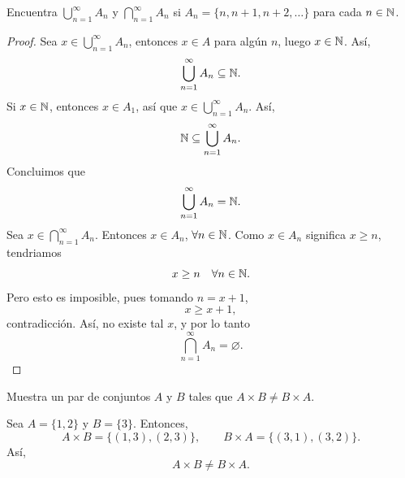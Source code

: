 \documentclass[12pt,a4paper]{book}
\begin{document}
    \begin{ejercicio}
        Encuentra $\bigcup_{n=1}^{\infty}A_{n}$ y $\bigcap_{n=1}^{\infty}A_{n}$ si $A_{n}=\{n,n+1,n+2,\dots\}$
        para cada $n\in\mathbb{N}$.
    \end{ejercicio}

    \begin{proof}
        Sea $x\in\bigcup_{n=1}^{\infty}A_{n}$, entonces $x\in A$ para algún $n$, luego $x\in\mathbb{N}$. Así,
        \begin{equation*}
            \bigcup_{n=1}^{\infty}A_{n}\subseteq\mathbb{N}.
        \end{equation*}
        Si $x\in\mathbb{N}$, entonces $x\in A_{1}$, así que $x\in\bigcup_{n=1}^{\infty}A_{n}$. Así,
        \begin{equation*}
            \mathbb{N}\subseteq\bigcup_{n=1}^{\infty}A_{n}.
        \end{equation*}
        Concluimos que
        \begin{equation*}
            \bigcup_{n=1}^{\infty}A_{n}=\mathbb{N}.
        \end{equation*}
        Sea $x\in\bigcap_{n=1}^{\infty}A_{n}$. Entonces $x\in A_{n}$, $\forall n\in\mathbb{N}$. Como $x\in A_{n}$
        significa $x\geq n$, tendriamos
        \begin{equation*}
            x\geq n\quad\forall n\in\mathbb{N}.
        \end{equation*} 
        Pero esto es imposible, pues tomando $n=x+1$,
        \begin{equation*}
            x\geq x+1,
        \end{equation*}
        contradicción. Así, no existe tal $x$, y por lo tanto
        \begin{equation*}
            \bigcap_{n=1}^{\infty}A_{n}=\varnothing.
        \end{equation*}
    \end{proof}

    \begin{ejercicio}
        Muestra un par de conjuntos $A$ y $B$ tales que $A\times B\neq B\times A$.
    \end{ejercicio}

    \begin{solucion}
        Sea $A=\{1,2\}$ y $B=\{3\}$. Entonces,
        \begin{equation*}
            A\times B=\{(1,3),(2,3)\},\qquad B\times A=\{(3,1),(3,2)\}.
        \end{equation*}
        Así,
        \begin{equation*}
            A\times B\neq B\times A.
        \end{equation*}
    \end{solucion}
\end{document}
